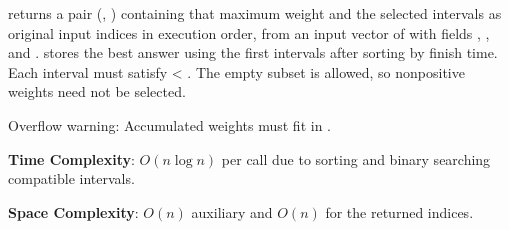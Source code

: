 \begin{compactitem}
  \item {} returns a pair (, ) containing that maximum weight and the selected intervals as original input indices in execution order, from an input vector of  with fields , , and .  stores the best answer using the first  intervals after sorting by finish time. Each interval must satisfy  \textless{} . The empty subset is allowed, so nonpositive weights need not be selected.
\end{compactitem}

Overflow warning: Accumulated weights must fit in .

\textbf{Time Complexity}: $O(n \log n)$ per call due to sorting and binary searching compatible intervals.

\textbf{Space Complexity}: $O(n)$ auxiliary and $O(n)$ for the returned indices.

